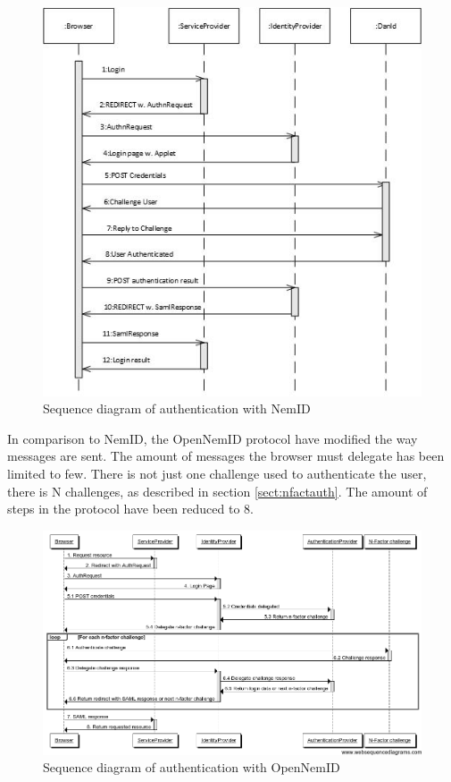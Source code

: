 \documentclass[twosided]{report}
\begin{document}
\begin{figure}[H]
	\centering
	\includegraphics{images/Sequence-login-Jacob.jpg}
	\caption[Sequence diagram of authentication with NemID]{Sequence diagram of authentication with NemID \cite{jacob}}
\end{figure}

In comparison to NemID, the OpenNemID protocol have modified the way messages are sent. The amount of messages the browser must delegate has been limited to few. There is not just one challenge used to authenticate the user, there is N challenges, as described in section \ref{sect:nfactauth}. The amount of steps in the protocol have been reduced to 8.

\begin{figure}[H]
	\centering
	\includegraphics[scale=0.4]{images/Open-NemId-(User-Login).png}
	\caption{Sequence diagram of authentication with OpenNemID}
\end{figure}
\end{document}
